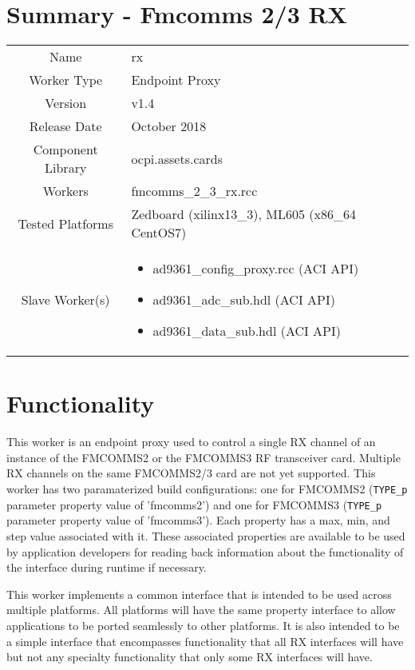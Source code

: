 \documentclass{article}
\author{} %
\date{Version \docVersion} %
\title{\docTitle}
\def\docVersion{1.4}
\def\comp{rx}
\def\Comp{Fmcomms 2/3 RX}
\begin{document}
\section*{Summary - \Comp}
\begin{tabular}{|c|M{13.5cm}|}
	\hline
	                  &                                        \\
	\hline
	Name              & \comp                                  \\
	\hline
	Worker Type       & Endpoint Proxy                         \\
	\hline
	Version           & v\docVersion \\
	\hline
	Release Date      & October 2018 \\
	\hline
	Component Library & ocpi.assets.cards \\
	\hline
	Workers           & fmcomms\_2\_3\_rx.rcc               \\
	\hline
	Tested Platforms  & Zedboard (xilinx13\_3), ML605 (x86\_64 CentOS7)                             \\
	\hline
	Slave Worker(s)   &
    \begin{itemize}
      \item ad9361\_config\_proxy.rcc (ACI API)
      \item ad9361\_adc\_sub.hdl (ACI API)
      \item ad9361\_data\_sub.hdl (ACI API)
    \end{itemize} \\
	\hline
\end{tabular}

\section*{Functionality}

	This worker is an endpoint proxy used to control a single RX channel of an instance of the FMCOMMS2 or the FMCOMMS3 RF transceiver card. Multiple RX channels on the same FMCOMMS2/3 card are not yet supported. This worker has two paramaterized build configurations: one for FMCOMMS2 (\verb+TYPE_p+ parameter property value of 'fmcomms2') and one for FMCOMMS3 (\verb+TYPE_p+ parameter property value of 'fmcomms3'). Each property has a max, min, and step value associated with it.  These associated properties are available to be used by application developers for reading back information about the functionality of the interface during runtime if necessary.\par\medskip
\noindent This worker implements a common interface that is intended to be used across multiple platforms.  All platforms will have the same property interface to allow applications to be ported seamlessly to other platforms.  It is also intended to be a simple interface that encompasses functionality that all RX interfaces will have but not any specialty functionality that only some RX interfaces will have.\par\medskip
\end{document}
